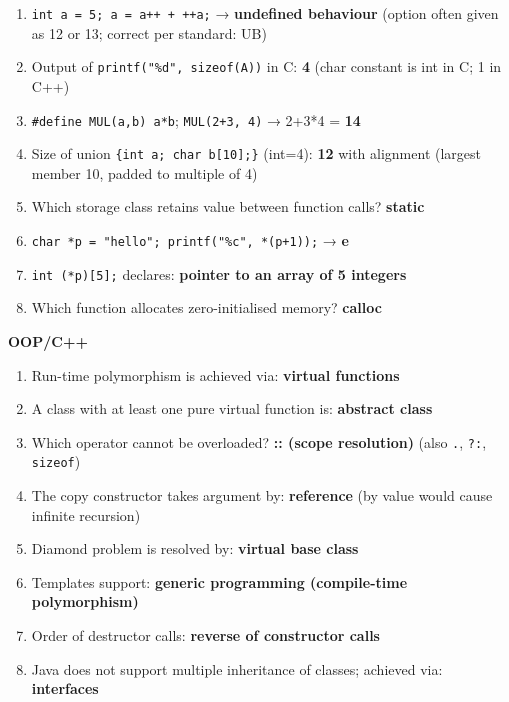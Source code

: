 \begin{enumerate}
\def\labelenumi{\arabic{enumi}.}
\setcounter{enumi}{6}
\tightlist
\item
  \texttt{int\ a\ =\ 5;\ a\ =\ a++\ +\ ++a;} → \textbf{undefined behaviour} (option often given as 12 or 13; correct per standard: UB)
\item
  Output of \texttt{printf("\%d",\ sizeof(\textquotesingle{}A\textquotesingle{}))} in C: \textbf{4} (char constant is int in C; 1 in C++)
\item
  \texttt{\#define\ MUL(a,b)\ a*b}; \texttt{MUL(2+3,\ 4)} → 2+3*4 = \textbf{14}
\item
  Size of union \texttt{\{int\ a;\ char\ b{[}10{]};\}} (int=4): \textbf{12} with alignment (largest member 10, padded to multiple of 4)
\item
  Which storage class retains value between function calls? \textbf{static}
\item
  \texttt{char\ *p\ =\ "hello";\ printf("\%c",\ *(p+1));} → \textbf{e}
\item
  \texttt{int\ (*p){[}5{]};} declares: \textbf{pointer to an array of 5 integers}
\item
  Which function allocates zero-initialised memory? \textbf{calloc}
\end{enumerate}

\textbf{OOP/C++}

\begin{enumerate}
\def\labelenumi{\arabic{enumi}.}
\setcounter{enumi}{14}
\tightlist
\item
  Run-time polymorphism is achieved via: \textbf{virtual functions}
\item
  A class with at least one pure virtual function is: \textbf{abstract class}
\item
  Which operator cannot be overloaded? \textbf{:: (scope resolution)} (also \texttt{.}, \texttt{?:}, \texttt{sizeof})
\item
  The copy constructor takes argument by: \textbf{reference} (by value would cause infinite recursion)
\item
  Diamond problem is resolved by: \textbf{virtual base class}
\item
  Templates support: \textbf{generic programming (compile-time polymorphism)}
\item
  Order of destructor calls: \textbf{reverse of constructor calls}
\item
  Java does not support multiple inheritance of classes; achieved via: \textbf{interfaces}
\end{enumerate}

